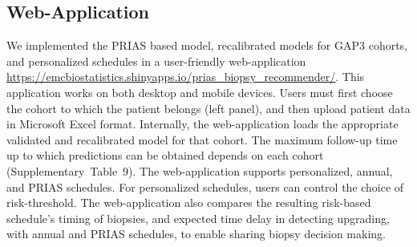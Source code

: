 \subsection{Web-Application}
We implemented the PRIAS based model, recalibrated models for GAP3 cohorts, and personalized schedules in a user-friendly web-application \url{https://emcbiostatistics.shinyapps.io/prias_biopsy_recommender/}. This application works on both desktop and mobile devices. Users must first choose the cohort to which the patient belongs (left panel), and then upload patient data in Microsoft Excel format. Internally, the web-application loads the appropriate validated and recalibrated model for that cohort. The maximum follow-up time up to which predictions can be obtained depends on each cohort (Supplementary~Table~9). The web-application supports personalized, annual, and PRIAS schedules. For personalized schedules, users can control the choice of risk-threshold. The web-application also compares the resulting risk-based schedule's timing of biopsies, and expected time delay in detecting upgrading, with annual and PRIAS schedules, to enable sharing biopsy decision making.